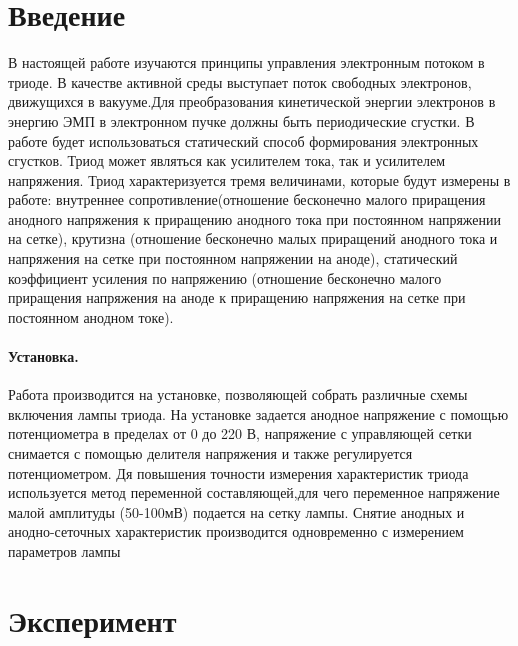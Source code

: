 \documentclass[a5paper,11pt]{extarticle}
\begin{document}


\tableofcontents
\newpage



\section*{Введение}
\vspace{-0.5em}
В настоящей работе изучаются принципы управления электронным потоком в триоде. В качестве активной среды выступает поток свободных электронов, движущихся в вакууме.Для преобразования кинетической энергии электронов в энергию ЭМП в электронном пучке должны быть периодические сгустки. В работе будет использоваться статический способ формирования электронных сгустков.
Триод может являться как усилителем тока, так и усилителем напряжения.
Триод характеризуется тремя величинами, которые будут измерены в работе: внутреннее сопротивление(отношение бесконечно малого приращения анодного напряжения к приращению анодного тока при постоянном напряжении на сетке), крутизна (отношение бесконечно малых приращений анодного тока и напряжения на сетке при постоянном напряжении на аноде), статический коэффициент усиления по напряжению (отношение бесконечно малого приращения напряжения на аноде к приращению напряжения на сетке при постоянном анодном токе).

\vspace{-0.5em}

\paragraph{Установка.} Работа производится на установке, позволяющей собрать различные
схемы включения лампы триода. На установке задается анодное
напряжение с помощью потенциометра в пределах от 0 до 220 В,
напряжение с управляющей сетки снимается с помощью делителя
напряжения и также регулируется потенциометром.
Дя повышения точности измерения характеристик триода используется
метод переменной составляющей,для чего переменное напряжение
малой амплитуды (50-100мВ) подается на сетку лампы.
Снятие анодных и анодно-сеточных характеристик производится
одновременно с измерением параметров лампы 

\section{Эксперимент}
\end{document}

